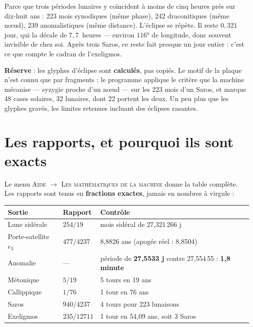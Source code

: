 \documentclass[a4paper,11pt]{article}
\begin{document}
\begin{info}
Parce que trois périodes lunaires y coïncident à moins de cinq heures près sur
dix-huit ans : 223 mois synodiques (même phase), 242 draconitiques (même
n\oe ud), 239 anomalistiques (même distance). L'éclipse se répète. Il reste
$0{,}321$ jour, qui la décale de $7{,}7$~heures — environ $116°$ de longitude,
donc souvent invisible de chez soi. Après trois Saros, ce reste fait presque un
jour entier : c'est ce que compte le cadran de l'exeligmos.

\textbf{Réserve} : les glyphes d'éclipse sont \textbf{calculés}, pas copiés. Le
motif de la plaque n'est connu que par fragments ; le programme applique le
critère que la machine mécanise — syzygie proche d'un n\oe ud — sur les 223
mois d'un Saros, et marque 48 cases solaires, 32 lunaires, dont 22 portent les
deux. Un peu plus que les glyphes gravés, les limites retenues incluant des
éclipses rasantes.
\end{info}

\section{Les rapports, et pourquoi ils sont exacts}

Le menu \textsc{Aide $\rightarrow$ Les mathématiques de la machine} donne la
table complète. Les rapports sont tenus en \textbf{fractions exactes}, jamais
en nombres à virgule :

\begin{center}
\begin{tabularx}{\textwidth}{@{}llX@{}}
\toprule
\rowcolor{lightblue}\textbf{Sortie} & \textbf{Rapport} & \textbf{Contrôle} \\
\midrule
Lune sidérale & $254/19$ & mois sidéral de 27,321\,266 j \\
Porte-satellite $e_3$ & $477/4237$ & 8,8826 ans (apogée réel : 8,8504) \\
Anomalie & — & période de \textbf{27,5533 j} contre 27,554\,55 : \textbf{1,8 minute} \\
Métonique & $5/19$ & 5 tours en 19 ans \\
Callippique & $1/76$ & 1 tour en 76 ans \\
Saros & $940/4237$ & 4 tours pour 223 lunaisons \\
Exeligmos & $235/12711$ & 1 tour en 54,09 ans, soit 3 Saros \\
\bottomrule
\end{tabularx}
\end{center}
\end{document}
